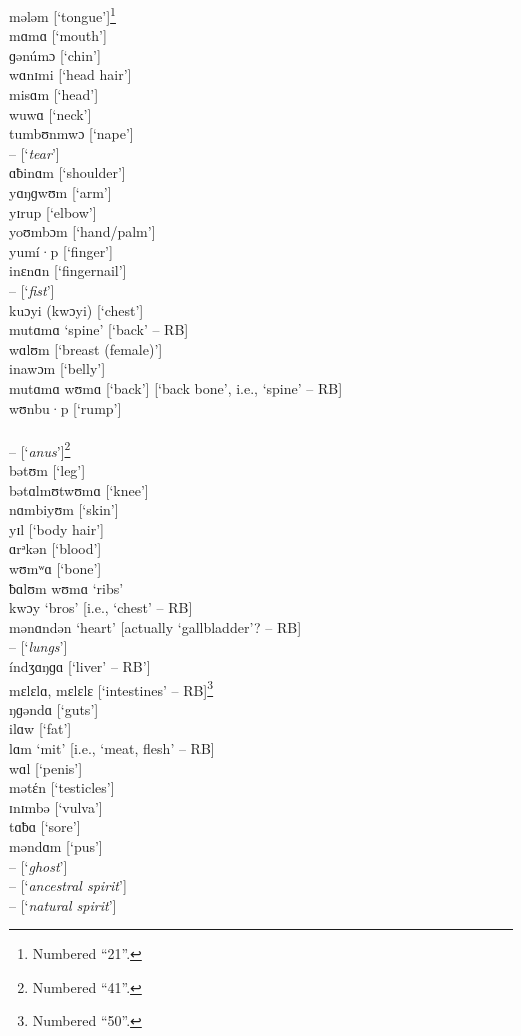 \noindent mələm      [‘tongue’]\footnote{Numbered “21”.}\\
mɑmɑ      [‘mouth’]\\
ɡənúmɔ    [‘chin’]\\
wɑnɪmi    [‘head hair’]\\
misɑm      [‘head’]\\
wuwɑ      [‘neck’]\\
tumbʊnmwɔ  [‘nape’]\\
 --         [‘\textit{tear}’]\\
ɑƀinɑm    [‘shoulder’]\\
yɑŋɡwʊm    [‘arm’]\\
yɪrup       [‘elbow’]\\
yoʊmbɔm    [‘hand/palm’]\\
yumí·p      [‘finger’]\\
inɛnɑn      [‘fingernail’]\\
 --         [‘\textit{fist}’]\\
kuɔyi (kwɔyi)  [‘chest’]\\
mutɑmɑ    ‘spine’ [‘back’ -- RB]\\
wɑlʊm      [‘breast (female)’]\\
inawɔm    [‘belly’]\\
mutɑmɑ wʊmɑ  [‘back’] [‘back bone’, i.e., ‘spine’ -- RB]\\
wʊnbu·p    [‘rump’]\\

\\

\noindent --         [‘\textit{anus}’]\footnote{Numbered “41”.}\\
bətʊm      [‘leg’]\\
bətɑlmʊtwʊmɑ  [‘knee’]\\
nɑmbiyʊm    [‘skin’]\\
yɪl        [‘body hair’]\\
ɑrᵊkən      [‘blood’]\\
wʊmʷɑ    [‘bone’]\\
ƀɑlʊm wʊmɑ  ‘ribs’\\
kwɔy      ‘bros’ [i.e., ‘chest’ -- RB]\\
mənɑndən    ‘heart’ [actually ‘gallbladder’? -- RB]\\
 --         [‘\textit{lungs}’]\\
índʒɑŋɡɑ    [‘liver’ -- RB’]\\
mɛlɛlɑ, mɛlɛlɛ  [‘intestines’ -- RB]\footnote{Numbered “50”.}\\
ŋɡəndɑ    [‘guts’]\\
ilɑw      [‘fat’]\\
lɑm      ‘mit’ [i.e., ‘meat, flesh’ -- RB]\\
wɑl       [‘penis’]\\
mətέn       [‘testicles’]\\
ɪnɪmbə     [‘vulva’]\\
tɑƀɑ       [‘sore’]\\
məndɑm     [‘pus’]\\
 --        [‘\textit{ghost}’]\\
 --        [‘\textit{ancestral spirit}’]\\
 --        [‘\textit{natural spirit}’]\\

